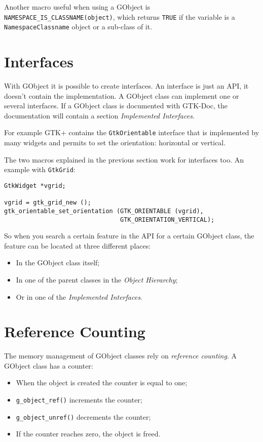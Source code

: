 Another macro useful when using a GObject is \lstinline{NAMESPACE_IS_CLASSNAME(object)}, which returns \lstinline{TRUE} if the variable is a \lstinline{NamespaceClassname} object or a sub-class of it.


\section{Interfaces}

With GObject it is possible to create interfaces. An interface is just an API, it doesn't contain the implementation. A GObject class can implement one or several interfaces. If a GObject class is documented with GTK-Doc, the documentation will contain a section \emph{Implemented Interfaces}.

For example GTK+ contains the \lstinline{GtkOrientable} interface that is implemented by many widgets and permits to set the orientation: horizontal or vertical.

The two macros explained in the previous section work for interfaces too. An example with \lstinline{GtkGrid}:
\begin{lstlisting}
GtkWidget *vgrid;

vgrid = gtk_grid_new ();
gtk_orientable_set_orientation (GTK_ORIENTABLE (vgrid),
                                GTK_ORIENTATION_VERTICAL);
\end{lstlisting}

So when you search a certain feature in the API for a certain GObject class, the feature can be located at three different places:
\begin{itemize}
  \item In the GObject class itself;
  \item In one of the parent classes in the \emph{Object Hierarchy};
  \item Or in one of the \emph{Implemented Interfaces}.
\end{itemize}

\section{Reference Counting}

The memory management of GObject classes rely on \emph{reference counting}. A GObject class has a counter:
\begin{itemize}
  \item When the object is created the counter is equal to one;
  \item \lstinline{g_object_ref()} increments the counter;
  \item \lstinline{g_object_unref()} decrements the counter;
  \item If the counter reaches zero, the object is freed.
\end{itemize}

